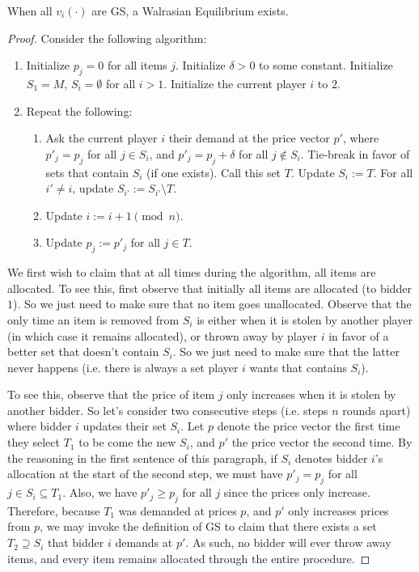 \begin{theorem} When all $v_i(\cdot)$ are GS, a Walrasian Equilibrium exists.
\end{theorem}
\begin{proof}
Consider the following algorithm:
\begin{enumerate}
\item Initialize $p_j = 0$ for all items $j$. Initialize $\delta > 0$ to some constant. Initialize $S_1 = M$, $S_i = \emptyset$ for all $i > 1$. Initialize the current player $i$ to $2$.
\item Repeat the following:
\begin{enumerate}
\item Ask the current player $i$ their demand at the price vector $p'$, where $p'_j = p_j$ for all $j \in S_i$, and $p'_j = p_j + \delta$ for all $j \notin S_i$. Tie-break in favor of sets that contain $S_i$ (if one exists). Call this set $T$. Update $S_i := T$. For all $i' \neq i$, update $S_{i'}:= S_{i'} \setminus T$.
\item Update $i := i+1 \pmod n$.
\item Update $p_j:= p'_j$ for all $j \in T$.
\end{enumerate}
\end{enumerate}

We first wish to claim that at all times during the algorithm, all items are allocated. To see this, first observe that initially all items are allocated (to bidder $1$). So we just need to make sure that no item goes unallocated. Observe that the only time an item is removed from $S_i$ is either when it is stolen by another player (in which case it remains allocated), or thrown away by player $i$ in favor of a better set that doesn't contain $S_i$. So we just need to make sure that the latter never happens (i.e. there is always a set player $i$ wants that contains $S_i$).

To see this, observe that the price of item $j$ only increases when it is stolen by another bidder. So let's consider two consecutive steps (i.e. steps $n$ rounds apart) where bidder $i$ updates their set $S_i$. Let $p$ denote the price vector the first time they select $T_1$ to be come the new $S_i$, and $p'$ the price vector the second time. By the reasoning in the first sentence of this paragraph, if $S_i$ denotes bidder $i$'s allocation at the start of the second step, we must have $p'_j = p_j$ for all $j \in S_i \subseteq T_1$. Also, we have $p'_j \geq p_j$ for all $j$ since the prices only increase. Therefore, because $T_1$ was demanded at prices $p$, and $p'$ only increases prices from $p$, we may invoke the definition of GS to claim that there exists a set $T_2 \supseteq S_i$ that bidder $i$ demands at $p'$. As such, no bidder will ever throw away items, and every item remains allocated through the entire procedure.


\end{proof}

